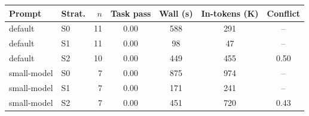 \begin{tabular}{@{}llrcccc@{}}
\toprule
Prompt & Strat. & $n$ & Task pass & Wall (s) & In-tokens (K) & Conflict \\
\midrule
default & S0 & 11 & 0.00 & 588 & 291 & -- \\
default & S1 & 11 & 0.00 & 98 & 47 & -- \\
default & S2 & 10 & 0.00 & 449 & 455 & 0.50 \\
\midrule
small-model & S0 & 7 & 0.00 & 875 & 974 & -- \\
small-model & S1 & 7 & 0.00 & 171 & 241 & -- \\
small-model & S2 & 7 & 0.00 & 451 & 720 & 0.43 \\
\bottomrule
\end{tabular}
